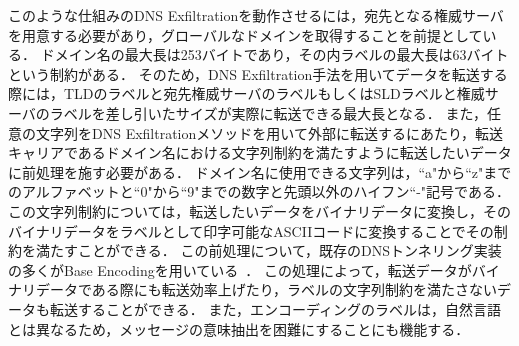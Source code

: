 このような仕組みのDNS Exfiltrationを動作させるには，宛先となる権威サーバを用意する必要があり，グローバルなドメインを取得することを前提としている．
ドメイン名の最大長は253バイトであり，その内ラベルの最大長は63バイトという制約がある．
そのため，DNS Exfiltration手法を用いてデータを転送する際には，TLDのラベルと宛先権威サーバのラベルもしくはSLDラベルと権威サーバのラベルを差し引いたサイズが実際に転送できる最大長となる．
また，任意の文字列をDNS Exfiltrationメソッドを用いて外部に転送するにあたり，転送キャリアであるドメイン名における文字列制約を満たすように転送したいデータに前処理を施す必要がある．
ドメイン名に使用できる文字列は，``a"から``z"までのアルファベットと``0"から``9"までの数字と先頭以外のハイフン``-"記号である．
この文字列制約については，転送したいデータをバイナリデータに変換し，そのバイナリデータをラベルとして印字可能なASCIIコードに変換することでその制約を満たすことができる．
この前処理について，既存のDNSトンネリング実装の多くがBase Encodingを用いている~\cite{rfc4648}．
この処理によって，転送データがバイナリデータである際にも転送効率上げたり，ラベルの文字列制約を満たさないデータも転送することができる．
また，エンコーディングのラベルは，自然言語とは異なるため，メッセージの意味抽出を困難にすることにも機能する．

